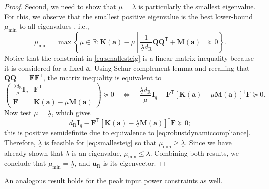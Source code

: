 \documentclass[preprint,3p]{elsarticle}
\newcommand{\T}{^{\mathsf T}}
\newcommand{\R}{\mathrm{R}}
\numberwithin{equation}{section}
\begin{document}
\begin{proof}
  Second, we need to show that $\mu= \underline{\lambda}$ is particularly the smallest eigenvalue. For this, we observe that the smallest positive eigenvalue is the best lower-bound $\mu_{\min}$ to all eigenvalues \citep{BenTal2001}, i.e.,
  \begin{equation}\label{eq:smallesteig}
    \mu_{\min} = \max \left\{\mu \in \mathbb{R}:  \mathbf{K}(\mathbf{a}) - \mu \left[\frac{1}{\underline{\lambda} d_\R} \mathbf{Q} \mathbf{Q}\T + \mathbf{M}(\mathbf{a}) \right]  \succeq0\right\}.
  \end{equation}
  Notice that the constraint in \eqref{eq:smallesteig} is a linear matrix inequality because it is considered for a fixed $\mathbf{a}$. Using Schur complement lemma and recalling that $\mathbf{Q} \mathbf{Q}\T = \mathbf{F} \mathbf{F}\T$, the matrix inequality is equivalent to
  \begin{equation}
    \begin{pmatrix}
      \frac{\underline{\lambda} d_\R}{\mu} \mathbf{I}_q& \mathbf{F}\T\\
      \mathbf{F} & \mathbf{K}(\mathbf{a}) - \mu \mathbf{M}(\mathbf{a})
    \end{pmatrix} \succeq 0
    \quad \Leftrightarrow \quad
    \frac{\underline{\lambda} d_\R}{\mu} \mathbf{I}_q - \mathbf{F}\T \left[\mathbf{K}(\mathbf{a}) - \mu \mathbf{M}(\mathbf{a})\right]^\dagger \mathbf{F} \succeq 0.
  \end{equation}
  Now test $\mu = \underline{\lambda}$, which gives
  \begin{equation}
    d_\R \mathbf{I}_q - \mathbf{F}\T \left[\mathbf{K}(\mathbf{a}) - \underline{\lambda} \mathbf{M}(\mathbf{a})\right]^\dagger \mathbf{F} \succeq 0;
  \end{equation}
  this is positive semidefinite due to equivalence to \eqref{eq:robustdynamiccompliance}. Therefore, $\underline{\lambda}$ is feasible for \eqref{eq:smallesteig} so that $\mu_{\min} \ge \underline{\lambda}$. Since we have already shown that $\underline{\lambda}$ is an eigenvalue, $\mu_{\min} \le \underline{\lambda}$. Combining both results, we conclude that $\mu_{\min} = \underline{\lambda}$, and $\mathbf{u}_\R$ is its eigenvector.
\end{proof}

An analogous result holds for the peak input power constraints as well.
\end{document}
